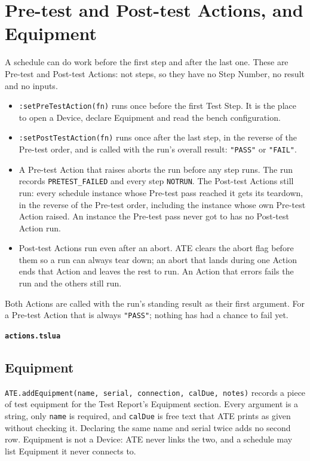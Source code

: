 \chapter{Pre-test and Post-test Actions, and Equipment}\label{ch:actions}

A schedule can do work before the first step and after the last one. These are Pre-test and
Post-test Actions: not steps, so they have no Step Number, no result and no inputs.

\begin{itemize}
  \item \texttt{:setPreTestAction(fn)} runs once before the first Test Step. It is the place to
    open a Device, declare Equipment and read the bench configuration.
  \item \texttt{:setPostTestAction(fn)} runs once after the last step, in the reverse of the
    Pre-test order, and is called with the run's overall result: \texttt{"PASS"} or
    \texttt{"FAIL"}.
  \item A Pre-test Action that raises aborts the run before any step runs. The run records
    \texttt{PRETEST\_FAILED} and every step \texttt{NOTRUN}. The Post-test Actions still run:
    every schedule instance whose Pre-test pass reached it gets its teardown, in the reverse of
    the Pre-test order, including the instance whose own Pre-test Action raised. An instance the
    Pre-test pass never got to has no Post-test Action run.
  \item Post-test Actions run even after an abort. ATE clears the abort flag before them so a
    run can always tear down; an abort that lands during one Action ends that Action and leaves
    the rest to run. An Action that errors fails the run and the others still run.
\end{itemize}

Both Actions are called with the run's standing result as their first argument. For a Pre-test
Action that is always \texttt{"PASS"}; nothing has had a chance to fail yet.

\noindent\textbf{\texttt{actions.tslua}}\par


\section{Equipment}

\texttt{ATE.addEquipment(name, serial, connection, calDue, notes)} records a piece of test
equipment for the Test Report's Equipment section. Every argument is a string, only
\texttt{name} is required, and \texttt{calDue} is free text that ATE prints as given without
checking it. Declaring the same name and serial twice adds no second row. Equipment is not a
Device: ATE never links the two, and a schedule may list Equipment it never connects to.


